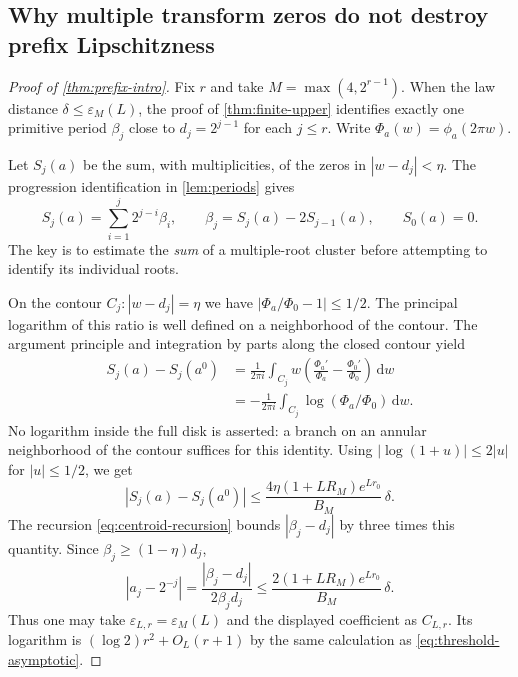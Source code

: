 \documentclass[11pt,a4paper]{article}
\numberwithin{equation}{section}
\theoremstyle{definition}
\theoremstyle{remark}
\newcommand{\eps}{\varepsilon}
\newcommand{\dd}{\,\mathrm d}
\begin{document}
\subsection{Why multiple transform zeros do not destroy prefix Lipschitzness}

\begin{proof}[Proof of \cref{thm:prefix-intro}]
Fix $r$ and take $M=\max(4,2^{r-1})$. When the law distance
$\delta\le\eps_M(L)$, the proof of \cref{thm:finite-upper} identifies
exactly one primitive period $\beta_j$ close to $d_j=2^{j-1}$ for each
$j\le r$. Write $\Phi_a(w)=\phi_a(2\pi w)$.

Let $S_j(a)$ be the sum, with multiplicities, of the zeros in
$|w-d_j|<\eta$. The progression identification in \cref{lem:periods} gives
\begin{equation}
 S_j(a)=\sum_{i=1}^{j}2^{j-i}\beta_i,
 \qquad \beta_j=S_j(a)-2S_{j-1}(a),\qquad S_0(a)=0.
 \label{eq:centroid-recursion}
\end{equation}
The key is to estimate the \emph{sum} of a multiple-root cluster before
attempting to identify its individual roots.

On the contour $C_j:|w-d_j|=\eta$ we have
$|\Phi_a/\Phi_0-1|\le1/2$. The principal logarithm of this ratio is
well defined on a neighborhood of the contour. The argument principle and
integration by parts along the closed contour yield
\begin{align}
 S_j(a)-S_j(a^0)
 &=\frac1{2\pi i}\int_{C_j}w
       \left(\frac{\Phi_a'}{\Phi_a}-\frac{\Phi_0'}{\Phi_0}\right)\dd w
 \\
 &=-\frac1{2\pi i}\int_{C_j}\log(\Phi_a/\Phi_0)\dd w.
 \label{eq:centroid-log}
\end{align}
No logarithm inside the full disk is asserted: a branch on an annular
neighborhood of the contour suffices for this identity.
Using $|\log(1+u)|\le2|u|$ for $|u|\le1/2$, we get
\begin{equation}
 |S_j(a)-S_j(a^0)|
 \le\frac{4\eta(1+LR_M)e^{Lr_0}}{B_M}\,\delta.
 \label{eq:centroid-bound}
\end{equation}
The recursion \eqref{eq:centroid-recursion} bounds $|\beta_j-d_j|$ by
three times this quantity. Since $\beta_j\ge(1-\eta)d_j$,
\[
 |a_j-2^{-j}|=\frac{|\beta_j-d_j|}{2\beta_jd_j}
 \le\frac{2(1+LR_M)e^{Lr_0}}{B_M}\,\delta.
\]
Thus one may take $\eps_{L,r}=\eps_M(L)$ and the displayed coefficient
as $C_{L,r}$. Its logarithm is $(\log2)r^2+O_L(r+1)$ by the same
calculation as \eqref{eq:threshold-asymptotic}.
\end{proof}
\end{document}
